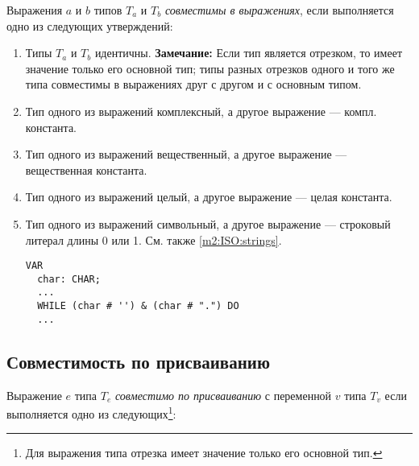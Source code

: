 Выражения $a$ и $b$ типов $T_a$ и $T_b$
{\em совместимы в выражениях}, если выполняется одно из 
следующих утверждений:
\renewcommand{\theenumi}{\alph{enumi}}
\begin{enumerate}
\item Типы $T_a$ и $T_b$ идентичны.
        {\bf Замечание:} Если тип является отрезком, то имеет 
значение только его основной тип; типы разных отрезков одного
и того же типа совместимы в выражениях друг с другом и с 
основным типом.

\item Тип одного из выражений комплексный, а другое выражение
--- компл. константа.

\item Тип одного из выражений вещественный, а другое выражение
--- вещественная константа.

\item Тип одного из выражений целый, а другое выражение
--- целая константа.

\item Тип одного из выражений символьный, а другое выражение
--- строковый литерал длины 0 или 1.
      См. также \ref{m2:ISO:strings}.

\begin{verbatim}
VAR
  char: CHAR;
  ...
  WHILE (char # '') & (char # ".") DO
  ...
\end{verbatim}

\end{enumerate}
\renewcommand{\theenumi}{\arabic{enumi}}

\subsection{Совместимость по присваиванию}\label{m2:ISO:comp:assign}

Выражение $e$ типа $T_e$ {\em совместимо по присваиванию}
с переменной $v$ типа $T_v$ если выполняется одно из 
следующих\footnote{Для выражения типа отрезка имеет значение только
его основной тип.}:


